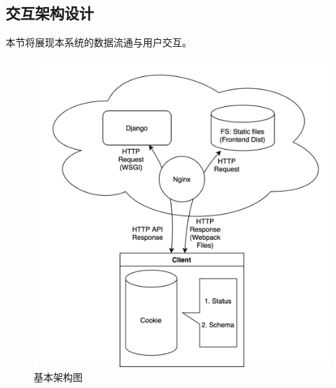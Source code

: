 \documentclass[hyperref]{ctexart}
\begin{document}
\subsection{交互架构设计}
本节将展现本系统的数据流通与用户交互。
\begin{figure}[H]
    \centering
    \includegraphics[scale=0.11]{figure/1.png}
    \caption{基本架构图}
    \label{Fig.1.1}
\end{figure}
\end{document}
